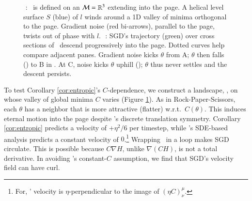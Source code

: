 \begin{figure}[h!]
    \hspace{-0.04cm}
    \squash
    \caption{%
        {\,\,\protect{}}: \Helix\ is defined on an $\mathcal{M}=\mathbb{R}^3$ 
        extending into the page.  A helical
        level surface $S$ (blue) of $l$ winds around 
        a 1D valley of minima orthogonal to the
        page.
        Gradient noise (red bi-arrows),
        parallel to the page, twists out of phase with $l$.
        {\,\,\protect{}}: SGD's trajectory (green) over 
        cross sections of \Helix\ descend progressively
        into the page.
        Dotted
        curves help compare adjacent panes.
        Gradient noise kicks $\theta$ from A; $\theta$ then falls
        (\!\!\protect{}) to B in
        {\!\!\protect{}}.  At C, noise kicks $\theta$
        uphill (\!\!\protect{}); $\theta$ thus never
        settles and the descent persists.
    }
    \squash\squash
    \label{fig:archimedes}
\end{figure}

To test Corollary \ref{cor:entropic}'s $C$-dependence,
we %
construct a landscape, \Helix, on
whose valley of global minima $C$ varies (Figure
\ref{fig:archimedes}).  As in Rock-Paper-Scissors, each 
$\theta$ has a neighbor that is more attractive (flatter) w.r.t.\
$C(\theta)$.  This induces eternal motion into the page
despite \Helix's discrete translation symmetry.
Corollary \ref{cor:entropic} predicts a velocity of
$+\eta^2/6$ per timestep, while \cite{ch18}'s SDE-based analysis
predicts a constant velocity of $0$.\footnote{
    For, \Helix' velocity is $\eta$-perpendicular to the image
    of $(\eta C)^\mu_\nu$.%
}
Wrapping \Helix\ in a loop makes SGD circulate. %
This is
possible because $C\nabla H$, unlike $\nabla(CH)$, is not a total
derivative. 
In avoiding \cite{we19b}'s constant-$C$ assumption, we 
find that SGD's velocity field can have curl. 

